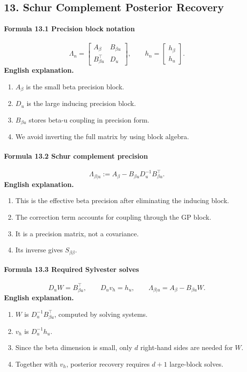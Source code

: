 \documentclass[12pt]{article}
\begin{document}
\subsection{13. Schur Complement Posterior Recovery}
\paragraph{Formula 13.1 Precision block notation}
\[
\Lambda_n=
\begin{bmatrix}
A_\beta&B_{\beta u}\\
B_{\beta u}^\top&D_u
\end{bmatrix},
\qquad
h_n=
\begin{bmatrix}
h_\beta\\h_u
\end{bmatrix}.
\]
\textbf{English explanation.}
\begin{enumerate}[leftmargin=2em]
\item \(A_\beta\) is the small beta precision block.
\item \(D_u\) is the large inducing precision block.
\item \(B_{\beta u}\) stores beta-u coupling in precision form.
\item We avoid inverting the full matrix by using block algebra.
\end{enumerate}

\paragraph{Formula 13.2 Schur complement precision}
\[
\Lambda_{\beta|u}
:=
A_\beta-B_{\beta u}D_u^{-1}B_{\beta u}^\top.
\]
\textbf{English explanation.}
\begin{enumerate}[leftmargin=2em]
\item This is the effective beta precision after eliminating the inducing block.
\item The correction term accounts for coupling through the GP block.
\item It is a precision matrix, not a covariance.
\item Its inverse gives \(S_{\beta\beta}\).
\end{enumerate}

\paragraph{Formula 13.3 Required Sylvester solves}
\[
D_uW=B_{\beta u}^\top,
\qquad
D_uv_h=h_u,
\qquad
\Lambda_{\beta|u}=A_\beta-B_{\beta u}W.
\]
\textbf{English explanation.}
\begin{enumerate}[leftmargin=2em]
\item \(W\) is \(D_u^{-1}B_{\beta u}^\top\), computed by solving systems.
\item \(v_h\) is \(D_u^{-1}h_u\).
\item Since the beta dimension is small, only \(d\) right-hand sides are needed for \(W\).
\item Together with \(v_h\), posterior recovery requires \(d+1\) large-block solves.
\end{enumerate}
\end{document}
